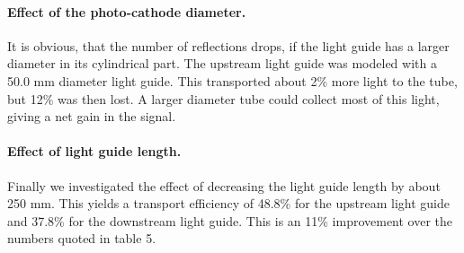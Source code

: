\paragraph{Effect of  the photo-cathode diameter.}
It is obvious, that  the number of reflections
 drops, if   the light guide has  a larger diameter in its cylindrical part.
The upstream light guide was modeled with a 50.0 mm diameter light guide.
This transported about 2\% more light to the tube, but 12\% was then lost. 
A larger diameter tube could collect most of this light, giving a net gain in the signal.


\paragraph{Effect of  light guide length.}
Finally we investigated the effect of decreasing the light guide length by about 250 mm.
This yields a transport efficiency of 48.8\% for the upstream light guide and 37.8\% for the downstream light guide.
This is an 11\% improvement over the numbers quoted in table 5.


